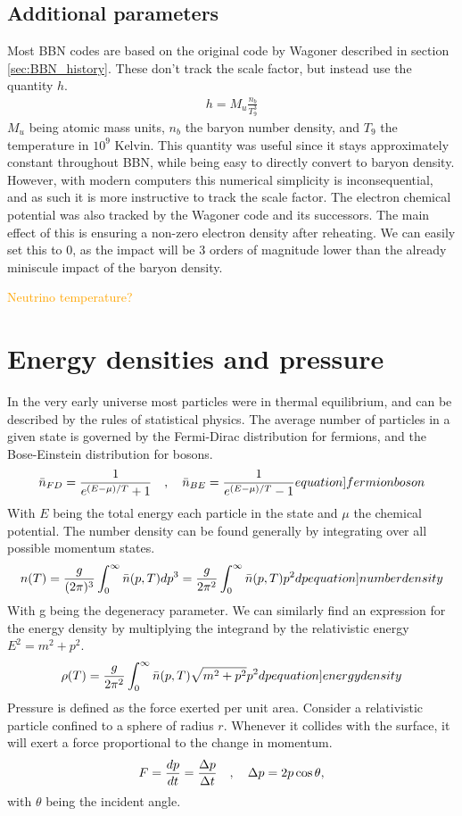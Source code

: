 \subsection{Additional parameters}
Most BBN codes are based on the original code by Wagoner described in section \ref{sec:BBN_history}. These don't track the scale factor, but instead use the quantity $h$.
\begin{align}
    h=M_u\frac{n_{b}}{T^3_9}
\end{align}
$M_u$ being atomic mass units, $n_b$ the baryon number density, and  $T_9$ the temperature in $10^9$ Kelvin. This quantity was useful since it stays approximately constant throughout BBN, while being easy to directly convert to baryon density. However, with modern computers this numerical simplicity is inconsequential, and as such it is more instructive to track the scale factor.
The electron chemical potential was also tracked by the Wagoner code and its successors. The main effect of this is ensuring a non-zero electron density after reheating. We can easily set this to 0, as the impact will be 3 orders of magnitude lower than the already miniscule impact of the baryon density.

\textcolor{orange}{Neutrino temperature?}


\section{Energy densities and pressure}

In the very early universe most particles were in thermal equilibrium, and can be described by the rules of statistical physics. The average number of particles in a given state is governed by the Fermi-Dirac distribution for fermions, and the Bose-Einstein distribution for bosons.
\begin{align}
    \bar{n}_{FD}=\frac{1}{e^{(E-\mu)/T}+1} \eqsep   \bar{n}_{BE}=\frac{1}{e^{(E-\mu)/T}-1}
    \label[equation]{fermionboson}
\end{align}
With $E$ being the total energy each particle in the state and $\mu$ the chemical potential. The number density can be found generally by integrating over all possible momentum states. 
\begin{align}
    n(T)=\frac{g}{(2\pi)^3}\int_{0}^{\infty}\bar{n}(p,T)dp^3=\frac{g}{2\pi^2}\int_{0}^{\infty}\bar{n}(p,T) p^2 dp
    \label[equation]{numberdensity}
\end{align}
With g being the degeneracy parameter. We can similarly find an expression for the energy density by multiplying the integrand by the relativistic energy $E^2=m^2+p^2$.
\begin{align}
    \rho(T)=\frac{g}{2\pi^2}\int_{0}^{\infty}\bar{n}(p,T)\sqrt{m^2+p^2} p^2 dp
    \label[equation]{energydensity}
\end{align}
Pressure is defined as the force exerted per unit area. Consider a relativistic particle confined to a sphere of radius $r$. Whenever it collides with the surface, it will exert a force proportional to the change in momentum. 
\begin{align}
    F=\frac{dp}{dt}=\frac{\Delta p }{\Delta t}\quad , \quad
    \Delta p = 2p \cos \theta,
\end{align}
with $\theta$ being the incident angle. 


